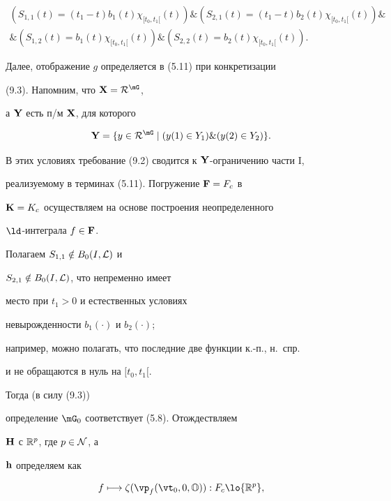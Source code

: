 \begin{multline}


({S_{1,1}}(t) = ({t_1} - t){b_1}(t){{\chi}_{[{t_0},{t_1}[}}(t)) \&


({S_{2,1}}(t) = ({t_1} - t){b_2}(t){{\chi}_{[{t_0},{t_1}[}}(t)) \&\\


\& ({S_{1,2}}(t) = {b_1}(t){{\chi}_{[{t_0},{t_1}[}}(t)) \&


({S_{2,2}}(t) = {b_2}(t){{\chi}_{[{t_0},{t_1}[}}(t)).


\end{multline}


Далее, отображение $g$ определяется в (5.11) при конкретизации


(9.3). Напомним, что ${\bold X} = {{\cal R}^{\mG}}$,


а ${\bold Y}$ есть п/м ${\bold X}$, для которого


$$


{\bold Y} = \{y \in {{\cal R}^{\mG}} \mid ({y(1)} \in {Y_1}) \&


({y(2)} \in {Y_2})\}.


$$


В этих условиях требование (9.2) сводится к ${\bold Y}$-ограничению части I,


реализуемому в терминах (5.11). Погружение ${\bold F} = {F_c}$ в


${\bold K} = {K_c}$ осуществляем на основе построения неопределенного


$\ld$-интеграла $f \in {\bold F}$.


Полагаем ${S_{1,1}} \notin {B_0}(I,{\cal L})$ и


${S_{2,1}} \notin {B_0}(I,{\cal L})$, что непременно имеет


место при ${t_1} > 0$ и естественных условиях


невырожденности ${b_1}(\cdot)$ и ${b_2}(\cdot)$;


например, можно полагать, что последние две функции к.-п., н.~спр.


и не обращаются в нуль на $[{t_0},{t_1}[$.


Тогда (в силу (9.3))


определение ${\mG}_0$ соответствует (5.8). Отождествляем


${\bold H}$ с ${{\Bbb R}^p}$, где $p \in {\cal N}$, а


${\bold h}$ определяем как


\begin{equation}


f \longmapsto {\zeta}({{\vp}_f}({{\vt}_0},0,{\Bbb O})):{F_c} \lo


{{\Bbb R}^p},


\end{equation}


